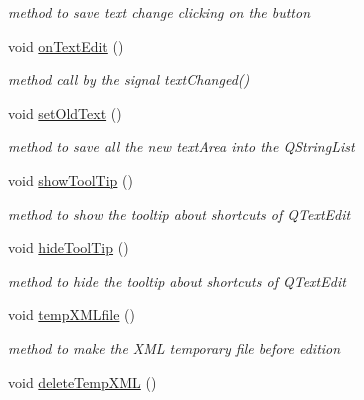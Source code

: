 \begin{DoxyCompactItemize}
\begin{DoxyCompactList}\small\item\em method to save text change clicking on the button \end{DoxyCompactList}\item 
\hypertarget{classArea_a40389ebbbb18a08cfe7f8257af8600d1}{void \hyperlink{classArea_a40389ebbbb18a08cfe7f8257af8600d1}{on\+Text\+Edit} ()}\label{classArea_a40389ebbbb18a08cfe7f8257af8600d1}

\begin{DoxyCompactList}\small\item\em method call by the signal text\+Changed() \end{DoxyCompactList}\item 
\hypertarget{classArea_abd44d8064b461f85abfd74263b69fb20}{void \hyperlink{classArea_abd44d8064b461f85abfd74263b69fb20}{set\+Old\+Text} ()}\label{classArea_abd44d8064b461f85abfd74263b69fb20}

\begin{DoxyCompactList}\small\item\em method to save all the new text\+Area into the Q\+String\+List \end{DoxyCompactList}\item 
\hypertarget{classArea_add92db2a542dbd1d6e3611834615eb09}{void \hyperlink{classArea_add92db2a542dbd1d6e3611834615eb09}{show\+Tool\+Tip} ()}\label{classArea_add92db2a542dbd1d6e3611834615eb09}

\begin{DoxyCompactList}\small\item\em method to show the tooltip about shortcuts of Q\+Text\+Edit \end{DoxyCompactList}\item 
\hypertarget{classArea_a66b28b7643058f05c36dcd9ea7717b36}{void \hyperlink{classArea_a66b28b7643058f05c36dcd9ea7717b36}{hide\+Tool\+Tip} ()}\label{classArea_a66b28b7643058f05c36dcd9ea7717b36}

\begin{DoxyCompactList}\small\item\em method to hide the tooltip about shortcuts of Q\+Text\+Edit \end{DoxyCompactList}\item 
\hypertarget{classArea_a9dfe0c8071d54a82eb9f5d0d939e4e82}{void \hyperlink{classArea_a9dfe0c8071d54a82eb9f5d0d939e4e82}{temp\+X\+M\+Lfile} ()}\label{classArea_a9dfe0c8071d54a82eb9f5d0d939e4e82}

\begin{DoxyCompactList}\small\item\em method to make the X\+M\+L temporary file before edition \end{DoxyCompactList}\item 
\hypertarget{classArea_a8d72a6b4b6a641627078599805ac675e}{void \hyperlink{classArea_a8d72a6b4b6a641627078599805ac675e}{delete\+Temp\+X\+M\+L} ()}\label{classArea_a8d72a6b4b6a641627078599805ac675e}


\end{DoxyCompactItemize}
